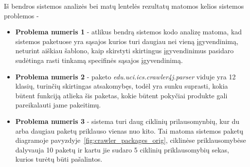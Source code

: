 Iš bendros sistemos analizės bei matų lentelės rezultatų matomos kelios sistemos problemos -
\begin{itemize}
    \item \textbf{Problema numeris 1} - atlikus bendrą sistemos kodo analizę matoma,
    kad sistemos paketuose yra sąsajos kurios turi daugiau nei vieną įgyvendinimą, neturint aiškiau šablono, kaip skirstyti skirtingus įgyvendinimus pasidaro sudėtinga
    rasti tinkamą specifinės sąsajos įgyvendinimą.
    \item \textbf{Problema numeris 2} - paketo \textit{edu.uci.ics.crawler4j.parser} viduje yra 12 klasių, turinčių skirtingas atsakomybęs, todėl yra sunku suprasti,
    kokia būtent funkciją atlieka šis paketas, kokie būtent pokyčiai produkte gali pareikalauti jame pakeitimų.
    \item \textbf{Problema numeris 3} - sistema turi daug ciklinių prilausomynbių, kur du arba daugiau paketų priklauso vienas nuo kito.
    Tai matoma sistemos paketų diagramoje pavyzdyje~\ref{fig:crawler_packages_orig}, ciklinėse priklausomybėse dalyvauja 10 paketų ir kartu jie sudaro 5 ciklinių priklausomybių sekas,
    kurios turėtų būti pašalintos.
\end{itemize}

